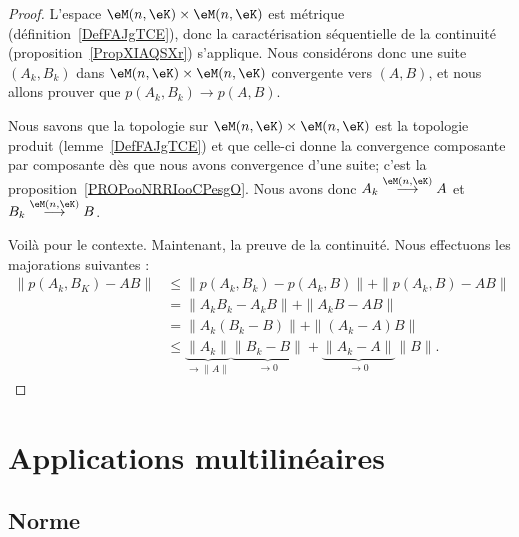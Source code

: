 \begin{proof}
	L'espace \( \eM(n,\eK)\times \eM(n,\eK)\) est métrique (définition~\ref{DefFAJgTCE}), donc la caractérisation séquentielle de la continuité (proposition~\ref{PropXIAQSXr}) s'applique. Nous considérons donc une suite \( (A_k,B_k)\) dans \( \eM(n,\eK)\times \eM(n,\eK)\) convergente vers \( (A,B)\), et nous allons prouver que \( p(A_k,B_k)\to p(A,B)\).

	Nous savons que la topologie sur \( \eM(n,\eK)\times \eM(n,\eK)\) est la topologie produit (lemme~\ref{DefFAJgTCE}) et que celle-ci donne la convergence composante par composante dès que nous avons convergence d'une suite; c'est la proposition~\ref{PROPooNRRIooCPesgO}. Nous avons donc \( A_k\stackrel{\eM(n,\eK)}{\longrightarrow}A\) et \( B_k\stackrel{\eM(n,\eK)}{\longrightarrow}B\).

	Voilà pour le contexte. Maintenant, la preuve de la continuité. Nous effectuons les majorations suivantes :
	\begin{subequations}
		\begin{align}
			\| p(A_k,B_K)-AB \| & \leq \| p(A_k,B_k)-p(A_k,B) \|+\| p(A_k,B)-AB \|                                                                   \\
			                    & =\| A_kB_k-A_kB \|+\| A_kB-AB \|                                                                                   \\
			                    & =\| A_k(B_k-B) \|+\| (A_k-A)B \|                                                                                   \\
			                    & \leq \underbrace{\| A_k \|}_{\to \| A \|}\underbrace{\| B_k-B \|}_{\to 0}+\underbrace{\| A_k-A \|}_{\to 0}\| B \|.
		\end{align}
	\end{subequations}
\end{proof}



\section{Applications multilinéaires}
\label{SECooBNZHooGfhPRK}

\subsection{Norme}


